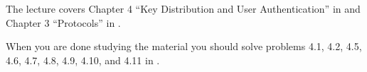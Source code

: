The lecture covers Chapter 4 ``Key Distribution and User Authentication'' in 
\cite{Stallings2013nse} and Chapter 3 ``Protocols'' in \cite{Anderson2008sea}.

When you are done studying the material you should solve problems 4.1, 4.2, 
4.5, 4.6, 4.7, 4.8, 4.9, 4.10, and 4.11 in \cite{Stallings2013nse}.
